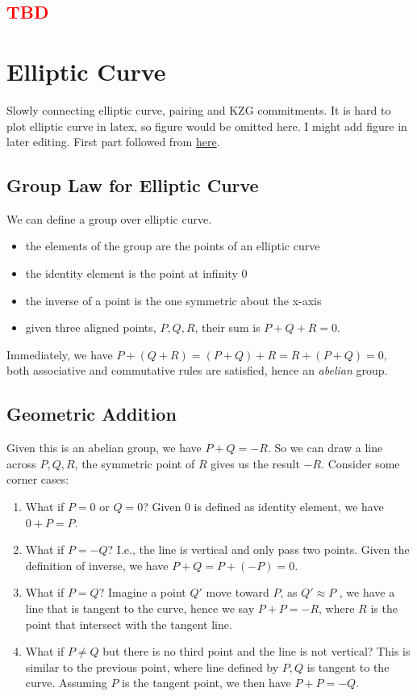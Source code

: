 \documentclass[10pt]{article}
\newcommand{\HL}[1]{\textcolor{red}{#1}}
\begin{document}
\subsection{\HL{TBD}}

\section{Elliptic Curve}
Slowly connecting elliptic curve, pairing and KZG commitments.
It is hard to plot elliptic curve in latex, so figure would be omitted here.
I might add figure in later editing.
First part followed from
\href{https://andrea.corbellini.name/2015/05/17/elliptic-curve-cryptography-a-gentle-introduction/}{here}.

\subsection{Group Law for Elliptic Curve}
We can define a group over elliptic curve.
\begin{itemize}
    \item the elements of the group are the points of an elliptic curve
    \item the identity element is the point at infinity 0
    \item the inverse of a point is the one symmetric about the x-axis
    \item given three aligned points, $P, Q, R$, their sum is $P + Q + R = 0$.
\end{itemize}
Immediately, we have $P + (Q + R) = (P + Q) + R = R + (P + Q) = 0$, both
associative and commutative rules are satisfied, hence an \emph{abelian} group.

\subsection{Geometric Addition}
Given this is an abelian group, we have $P + Q = -R$. So we can draw a line
across $P, Q, R$, the symmetric point of $R$ gives us the result $-R$.
Consider some corner cases:
\begin{enumerate}
    \item What if $P = 0$ or $Q = 0$? Given $0$ is defined as identity
        element, we have $0 + P = P$.
    \item What if $P = -Q$? I.e., the line is vertical and only pass two
        points. Given the definition of inverse, we have $P + Q = P + (-P) =
        0$.
    \item What if $P = Q$? Imagine a point $Q'$ move toward $P$, as $Q' \approx
        P$ , we have a line that is tangent to the curve, hence we say $P + P =
        -R$, where $R$ is the point that intersect with the tangent line.  
    \item What if $P \neq Q$ but there is no third point and the line is not
        vertical? This is similar to the previous point, where line defined by
        $P, Q$ is tangent to the curve. Assuming $P$ is the tangent point, we
        then have $P + P = -Q$.
\end{enumerate}
\end{document}
